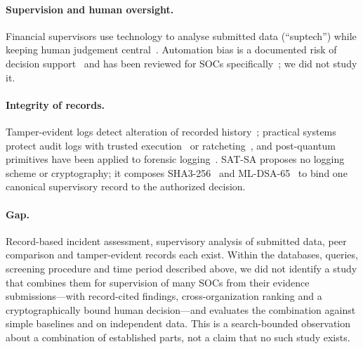 \paragraph{Supervision and human oversight.} Financial supervisors use technology to
analyse submitted data (``suptech'') while keeping human judgement
central~\cite{broeders2018suptech}. Automation bias is a documented risk of decision
support~\cite{parasuraman2010automation} and has been reviewed for SOCs
specifically~\cite{tilbury2024automationbias}; we did not study it.

\paragraph{Integrity of records.} Tamper-evident logs detect alteration of recorded
history~\cite{schneier1999logs,crosby2009logging}; practical systems protect audit logs
with trusted execution~\cite{paccagnella2020custos} or ratcheting~\cite{guardiola2022sealfs},
and post-quantum primitives have been applied to forensic logging~\cite{fugkeaw2026pqabl}.
SAT-SA proposes no logging scheme or cryptography; it composes
SHA3-256~\cite{nist2015fips202} and ML-DSA-65~\cite{nist2024fips204} to bind one
canonical supervisory record to the authorized decision.

\paragraph{Gap.} Record-based incident assessment, supervisory analysis of submitted
data, peer comparison and tamper-evident records each exist. Within the databases,
queries, screening procedure and time period described above, we did not identify a
study that combines them for supervision of many SOCs from their evidence submissions---with
record-cited findings, cross-organization ranking and a cryptographically bound human
decision---and evaluates the combination against simple baselines and on independent
data. This is a search-bounded observation about a combination of established parts,
not a claim that no such study exists.
